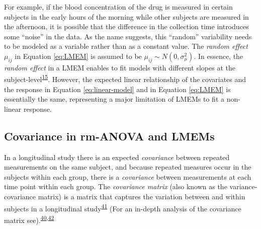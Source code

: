 \documentclass[
]{article}
\begin{document}
For example, if the blood concentration of the drug is measured in certain subjects in the early hours of the morning while other subjects are measured in the afternoon, it is possible that the difference in the collection time introduces some ``noise'' in the data. As the name suggests, this ``random'' variability needs to be modeled as a variable rather than as a constant value. The \emph{random effect} \(\mu_{ij}\) in Equation \eqref{eq:LMEM} is assumed to be \(\mu_{ij} \sim N(0,\sigma^2_\mu)\). In essence, the \emph{random effect} in a LMEM enables to fit models with different slopes at the subject-level\textsuperscript{\protect\hyperlink{ref-pinheiro2006}{15}}. However, the expected linear relationship of the covariates and the response in Equation \eqref{eq:linear-model} and in Equation \eqref{eq:LMEM} is essentially the same, representing a major limitation of LMEMs to fit a non-linear response.

\hypertarget{covariance-in-rm-anova-and-lmems}{%
\subsection{Covariance in rm-ANOVA and LMEMs}\label{covariance-in-rm-anova-and-lmems}}

In a longitudinal study there is an expected \emph{covariance} between repeated measurements on the same subject, and because repeated measures occur in the subjects within each group, there is a \emph{covariance} between measurements at each time point within each group. The \emph{covariance matrix} (also known as the variance-covariance matrix) is a matrix that captures the variation between and within subjects in a longitudinal study\textsuperscript{\protect\hyperlink{ref-wolfinger1996}{41}} (For an in-depth analysis of the covariance matrix see).\textsuperscript{\protect\hyperlink{ref-west2014}{40},\protect\hyperlink{ref-weiss2005}{42}}
\end{document}
